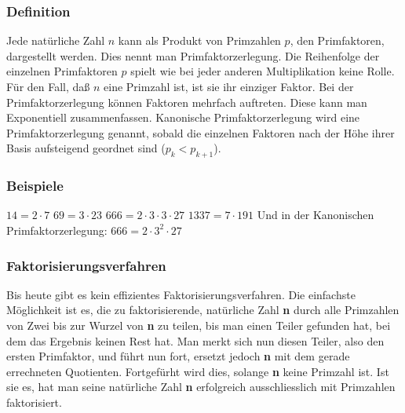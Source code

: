 \subsubsection{Definition}
Jede natürliche Zahl $n$ kann als Produkt von Primzahlen $p$, den Primfaktoren, dargestellt werden. Dies nennt man Primfaktorzerlegung. Die Reihenfolge der einzelnen Primfaktoren $p$ spielt wie bei jeder anderen Multiplikation keine Rolle. Für den Fall, daß $n$ eine Primzahl ist, ist sie ihr einziger Faktor. Bei der Primfaktorzerlegung können Faktoren mehrfach auftreten. Diese kann man Exponentiell zusammenfassen. Kanonische Primfaktorzerlegung wird eine Primfaktorzerlegung genannt, sobald die einzelnen Faktoren nach der Höhe ihrer Basis aufsteigend geordnet sind ($p_k < p_{k+1}$).
\subsubsection{Beispiele}
$14 = 2 \cdot 7$\newline
$69 = 3 \cdot 23$\newline
$666 = 2 \cdot 3 \cdot 3 \cdot 27$\newline
$1337 = 7 \cdot 191$\newline\newline
Und in der Kanonischen Primfaktorzerlegung:\newline\newline
$666 = 2 \cdot 3^2 \cdot 27$
\subsubsection{Faktorisierungsverfahren}
Bis heute gibt es kein effizientes Faktorisierungsverfahren. Die einfachste Möglichkeit ist es, die zu faktorisierende, natürliche Zahl \textbf{n} durch alle Primzahlen von Zwei bis zur Wurzel von \textbf{n} zu teilen, bis man einen Teiler gefunden hat, bei dem das Ergebnis keinen Rest hat. Man merkt sich nun diesen Teiler, also den ersten Primfaktor, und führt nun fort, ersetzt jedoch \textbf{n} mit dem gerade errechneten Quotienten. Fortgefürht wird dies, solange \textbf{n} keine Primzahl ist. Ist sie es, hat man seine natürliche Zahl \textbf{n} erfolgreich ausschliesslich mit Primzahlen faktorisiert.
